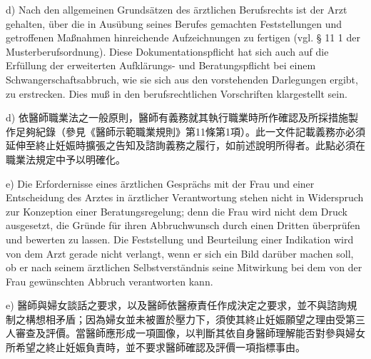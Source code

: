 \documentclass[12pt]{article}
\begin{document}
\begin{sourcepara}[title={原文D.139}]
d) Nach den allgemeinen Grundsätzen des ärztlichen Berufsrechts ist der Arzt gehalten, über die in Ausübung seines Berufes gemachten Feststellungen und getroffenen Maßnahmen hinreichende Aufzeichnungen zu fertigen (vgl. § 11 \abbrAbs{} 1 der Musterberufsordnung). Diese Dokumentationspflicht hat sich auch auf die Erfüllung der erweiterten Aufklärungs- und Beratungspflicht bei einem Schwangerschaftsabbruch, wie sie sich aus den vorstehenden Darlegungen ergibt, zu erstrecken. Dies muß in den berufsrechtlichen Vorschriften klargestellt sein.
\end{sourcepara}
\begin{transpara}
d) 依醫師職業法之一般原則，醫師有義務就其執行職業時所作確認及所採措施製作足夠紀錄（參見《醫師示範職業規則》第11條第1項）。此一文件記載義務亦必須延伸至終止妊娠時擴張之告知及諮詢義務之履行，如前述說明所得者。此點必須在職業法規定中予以明確化。
\end{transpara}

\begin{sourcepara}[title={原文D.140}]
e) Die Erfordernisse eines ärztlichen Gesprächs mit der Frau und einer Entscheidung des Arztes in ärztlicher Verantwortung stehen nicht in Widerspruch zur Konzeption einer Beratungsregelung; denn die Frau wird nicht dem Druck ausgesetzt, die Gründe für ihren Abbruchwunsch durch einen Dritten überprüfen und bewerten zu lassen. Die Feststellung und Beurteilung einer Indikation wird von dem Arzt gerade nicht verlangt, wenn er sich ein Bild darüber machen soll, ob er nach seinem ärztlichen Selbstverständnis seine Mitwirkung bei dem von der Frau gewünschten Abbruch verantworten kann.
\end{sourcepara}
\begin{transpara}
e) 醫師與婦女談話之要求，以及醫師依醫療責任作成決定之要求，並不與諮詢規制之構想相矛盾；因為婦女並未被置於壓力下，須使其終止妊娠願望之理由受第三人審查及評價。當醫師應形成一項圖像，以判斷其依自身醫師理解能否對參與婦女所希望之終止妊娠負責時，並不要求醫師確認及評價一項指標事由。
\end{transpara}
\end{document}
